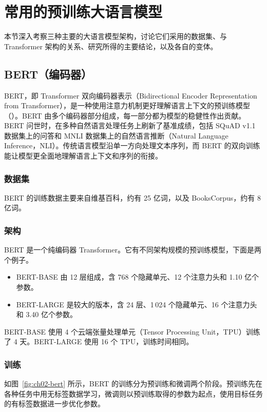 \section{常用的预训练大语言模型}
本节深入考察三种主要的大语言模型架构，讨论它们采用的数据集、与 Transformer 架构的关系、研究所得的主要结论，以及各自的变体。

\subsection{BERT（编码器）}
\label{sec:ch02-bert}
BERT，即 Transformer 双向编码器表示（Bidirectional Encoder Representation from Transformer），是一种使用注意力机制更好理解语言上下文的预训练模型（）。BERT 由多个编码器部分组成，每一部分都为模型的稳健性作出贡献。BERT 问世时，在多种自然语言处理任务上刷新了基准成绩，包括 SQuAD v1.1 数据集上的问答和 MNLI 数据集上的自然语言推断（Natural Language Inference，NLI）。传统语言模型沿单一方向处理文本序列，而 BERT 的双向训练能让模型更全面地理解语言上下文和序列的衔接。

\subsubsection{数据集}
BERT 的训练数据主要来自维基百科，约有 25 亿词，以及 BooksCorpus，约有 8 亿词。

\subsubsection{架构}
BERT 是一个纯编码器 Transformer。它有不同架构规模的预训练模型，下面是两个例子。
\begin{itemize}
\item BERT-BASE 由 12 层组成，含 768 个隐藏单元、12 个注意力头和 1.10 亿个参数。
\item BERT-LARGE 是较大的版本，含 24 层、1\,024 个隐藏单元、16 个注意力头和 3.40 亿个参数。
\end{itemize}
BERT-BASE 使用 4 个云端张量处理单元（Tensor Processing Unit，TPU）训练了 4 天。BERT-LARGE 使用 16 个 TPU，训练时间相同。

\subsubsection{训练}
如图~\ref{fig:ch02-bert} 所示，BERT 的训练分为预训练和微调两个阶段。预训练先在各种任务中用无标签数据学习，微调则以预训练取得的参数为起点，使用目标任务的有标签数据进一步优化参数。

